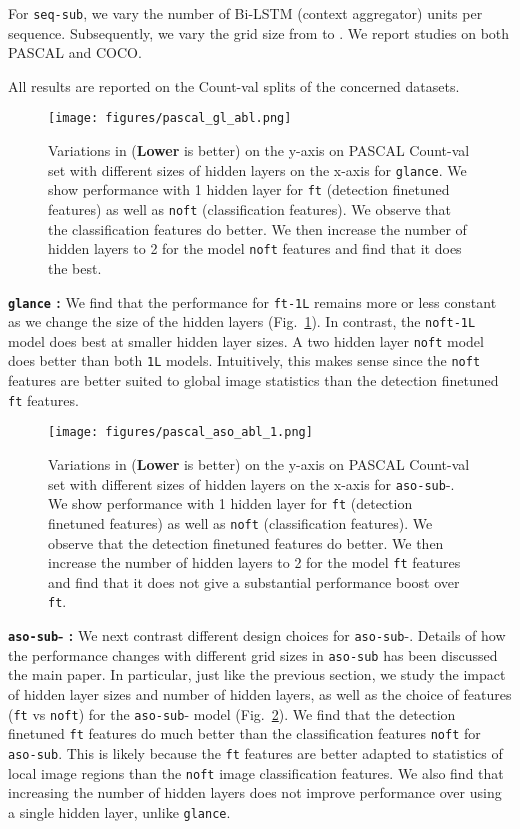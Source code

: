 \documentclass[10pt,twocolumn,letterpaper]{article}
\newcommand{\sub}{\texttt{aso-sub}\xspace}
\newcommand{\seq}{\texttt{seq-sub}\xspace}
\newcommand{\glance}{\texttt{glance}\xspace}
\newcommand{\reffig}[1]{Fig.~\ref{#1}}
\begin{document}
For \seq, we vary the number of Bi-LSTM (context aggregator) units per sequence. Subsequently, we vary the grid size from  to . We report studies on both PASCAL and COCO.

All results are reported on the Count-val splits of the concerned datasets.





\begin{figure}
\texttt{[image: figures/pascal\_gl\_abl.png]}
\caption{Variations in  (\textbf{Lower} is better) on the y-axis on PASCAL Count-val set with different sizes of hidden layers on the x-axis for \glance. We show performance with 1 hidden layer for \texttt{ft} (detection finetuned features) as well as \texttt{noft} (classification features). We observe that the classification features do better. We then increase the number of hidden layers to 2 for the model \texttt{noft} features and find that it does the best.}
\label{fig:pascal_glance}
\end{figure}

\textbf{\glance{} : }
We find that the performance for \texttt{ft-1L} remains more or less constant as we change the size of the hidden layers (\reffig{fig:pascal_glance}). In contrast, the \texttt{noft-1L} model does best at smaller hidden layer sizes. A two hidden layer \texttt{noft} model does better than both \texttt{1L} models. Intuitively, this makes sense since the \texttt{noft} features are better suited to global image statistics than the detection finetuned \texttt{ft} features.

\begin{figure}
\texttt{[image: figures/pascal\_aso\_abl\_1.png]}
\caption{Variations in  (\textbf{Lower} is better) on the y-axis on PASCAL Count-val set with different sizes of hidden layers on the x-axis for \sub-\texttt{}. We show performance with 1 hidden layer for \texttt{ft} (detection finetuned features) as well as \texttt{noft} (classification features). We observe that the detection finetuned features do better. We then increase the number of hidden layers to 2 for the model \texttt{ft} features and find that it does not give a substantial performance boost over \texttt{ft}.}
\label{fig:pascal_asosub}
\end{figure}

\textbf{\sub-\texttt{} : }
We next contrast different design choices for \sub-\texttt{}. Details of how the performance changes with different grid sizes in \sub has been discussed the main paper. In particular, just like the previous section, we study the impact of hidden layer sizes and number of hidden layers, as well as the choice of features (\texttt{ft} vs \texttt{noft}) for the \sub-\texttt{} model (\reffig{fig:pascal_asosub}). We find that the detection finetuned \texttt{ft} features do much better than the classification features \texttt{noft} for \sub. This is likely because the \texttt{ft} features are better adapted to statistics of local image regions than the \texttt{noft} image classification features. We also find that increasing the number of hidden layers does not improve performance over using a single hidden layer, unlike \glance. 
\end{document}

